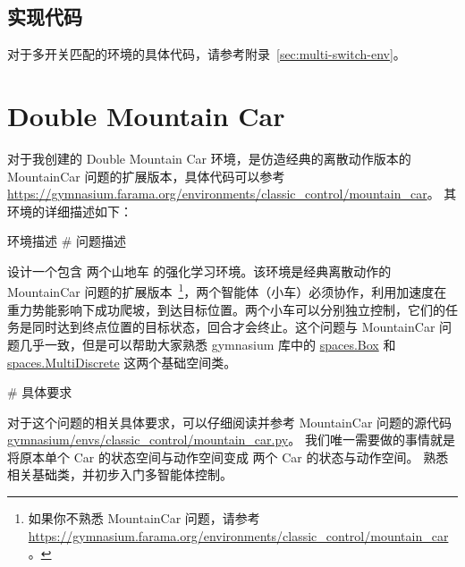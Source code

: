 \documentclass[citestyle=gb7714-2015, bibstyle=gb7714-2015,lang=cn,14pt,scheme=chinese]{elegantbook}
\begin{document}
\subsection{实现代码}

对于多开关匹配的环境的具体代码，请参考附录~\ref{sec:multi-switch-env}。

\section{Double Mountain Car}

对于我创建的 Double Mountain Car 环境，是仿造经典的离散动作版本的 MountainCar 问题的扩展版本，具体代码可以参考 \href{https://gymnasium.farama.org/environments/classic_control/mountain_car}{https://gymnasium.farama.org/environments/classic\_control/mountain\_car}。
其环境的详细描述如下：

\begin{definition*}{环境描述}
\# 问题描述

    设计一个包含 两个山地车 的强化学习环境。该环境是经典离散动作的 MountainCar 问题的扩展版本~\footnote{如果你不熟悉 MountainCar 问题，请参考 \href{https://gymnasium.farama.org/environments/classic_control/mountain_car}{https://gymnasium.farama.org/environments/classic\_control/mountain\_car}。}，两个智能体（小车）必须协作，利用加速度在重力势能影响下成功爬坡，到达目标位置。两个小车可以分别独立控制，它们的任务是同时达到终点位置的目标状态，回合才会终止。这个问题与 MountainCar 问题几乎一致，但是可以帮助大家熟悉 gymnasium 库中的 \href{https://gymnasium.farama.org/api/spaces/fundamental/#gymnasium.spaces.Box}{spaces.Box} 和 \href{https://gymnasium.farama.org/api/spaces/fundamental/#gymnasium.spaces.MultiDiscrete}{spaces.MultiDiscrete} 这两个基础空间类。

\# 具体要求

对于这个问题的相关具体要求，可以仔细阅读并参考 MountainCar 问题的源代码 \href{https://github.com/Farama-Foundation/Gymnasium/blob/main/gymnasium/envs/classic_control/mountain_car.py}{gymnasium/envs/classic\_control/mountain\_car.py}。
我们唯一需要做的事情就是将原本单个 Car 的状态空间与动作空间变成 两个 Car 的状态与动作空间。
熟悉相关基础类，并初步入门多智能体控制。
\end{definition*}
\end{document}
